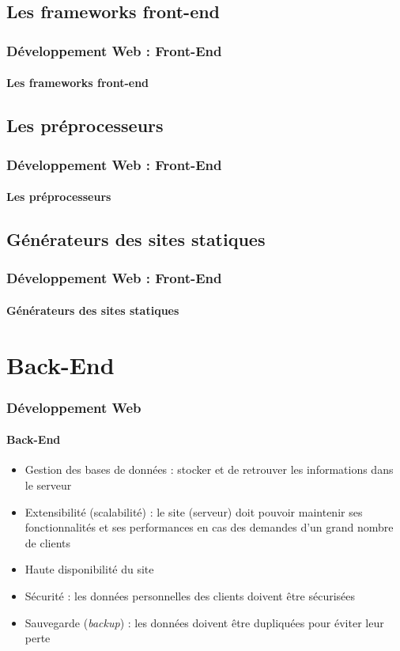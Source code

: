 \documentclass[xcolor=table]{beamer}
\begin{document}
\subsection{Les frameworks front-end}

\begin{frame}
\frametitle{Développement Web : Front-End}
\framesubtitle{Les frameworks front-end}

\end{frame}


\subsection{Les préprocesseurs}

\begin{frame}
\frametitle{Développement Web : Front-End}
\framesubtitle{Les préprocesseurs}

\end{frame}


\subsection{Générateurs des sites statiques}

\begin{frame}
\frametitle{Développement Web : Front-End}
\framesubtitle{Générateurs des sites statiques}

\end{frame}


\section{Back-End}

\begin{frame}
\frametitle{Développement Web}
\framesubtitle{Back-End}

\begin{itemize}
	\item Gestion des bases de données : stocker et de retrouver les informations dans le serveur
	\item Extensibilité (scalabilité) : le site (serveur) doit pouvoir maintenir ses fonctionnalités et ses performances en cas des demandes d'un grand nombre de clients
	\item Haute disponibilité du site
	\item Sécurité : les données personnelles des clients doivent être sécurisées
	\item Sauvegarde (\textit{backup}) : les données doivent être dupliquées pour éviter leur perte
\end{itemize}

\end{frame}
\end{document}
